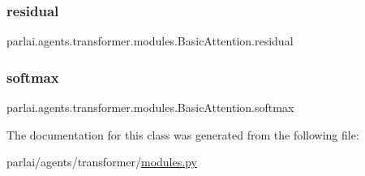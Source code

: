 \subsubsection{\texorpdfstring{residual}{residual}}
{\footnotesize\ttfamily parlai.\+agents.\+transformer.\+modules.\+Basic\+Attention.\+residual}

\mbox{\label{classparlai_1_1agents_1_1transformer_1_1modules_1_1BasicAttention_a669fa3f4cd988703371fc127a4943f07}} 
\subsubsection{\texorpdfstring{softmax}{softmax}}
{\footnotesize\ttfamily parlai.\+agents.\+transformer.\+modules.\+Basic\+Attention.\+softmax}



The documentation for this class was generated from the following file\+:\begin{DoxyCompactItemize}
\item 
parlai/agents/transformer/\hyperlink{parlai_2agents_2transformer_2modules_8py}{modules.\+py}\end{DoxyCompactItemize}
